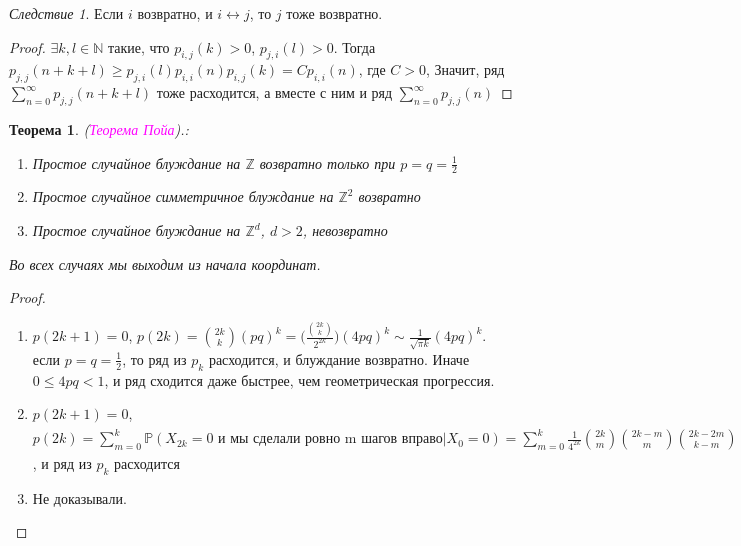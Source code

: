 \documentclass[a4paper,100pt]{article}
\theoremstyle{indented}
\newtheorem{theorem}{Теорема}
\theoremstyle{definition}
\theoremstyle{remark}
\newtheorem{cons}{Следствие}
\begin{document}
\begin{cons}
  Если $i$ возвратно, и $i \leftrightarrow j$, то $j$ тоже возвратно.
\end{cons}

\begin{proof}
  $\exists k, l \in \mathbb{N}$ такие, что $p_{i, j}(k)>0$, $p_{j, i}(l)>0$. Тогда $p_{j, j}(n+k+l) \geq p_{j, i}(l)p_{i, i}(n)p_{i, j}(k)=Cp_{i, i}(n)$, где $C>0$, Значит, ряд $\sum_{n=0}^{\infty} p_{j, j}(n+k+l)$ тоже расходится, а вместе с ним и ряд $\sum_{n=0}^{\infty} p_{j, j}(n)$
\end{proof}

\begin{theorem}
(\hypertarget{n43}{\textcolor{magenta}{\textit{Теорема Пойа}}}).: 
\begin{enumerate}
    \item Простое случайное блуждание на $\mathbb{Z}$ возвратно только при $p=q=\frac{1}{2}$
    \item Простое случайное симметричное блуждание на $\mathbb{Z}^2$ возвратно
    \item Простое случайное блуждание на $\mathbb{Z}^d$, $d>2$, невозвратно
\end{enumerate}
Во всех случаях мы выходим из начала координат.
\end{theorem}

\begin{proof} \
\begin{enumerate}
    \item $p(2k+1)=0$, $p(2k)= {2k \choose k}(pq)^k = \Big ( \frac{{2k \choose k}}{2^{2k}} \Big )(4pq)^k \sim \frac{1}{\sqrt{\pi k}}(4pq)^k$. если $p=q=\frac{1}{2}$, то ряд из $p_k$ расходится, и блуждание возвратно. Иначе $0 \leq 4pq<1$, и ряд сходится даже быстрее, чем геометрическая прогрессия.
    \item  $p(2k+1)=0$, $p(2k)=\sum_{m=0}^k \mathbb{P}(X_{2k}=0 \text{ и мы сделали ровно m шагов вправо} | X_0=0)=\sum_{m=0}^k \frac{1}{4^{2k}} {2k \choose m}{2k-m \choose m}{2k-2m \choose k-m}=\frac{1}{4^{2k}} \sum_{m=0}^k  \frac{(2k)!}{m!(2k-m)!} \frac{(2k-m)!}{m!(2k-2m)!} \frac{(2k-2m)!}{((k-m)!)(k-m)!}=\frac{1}{4^{2k}} \sum_{m=0}^k  \frac{(2k)!}{(m!)^2((k-m)!)^2}=\frac{1}{4^{2k}} {2k \choose k}\sum_{m=0}^k {k\choose m}^2=\Big (\frac{{2k \choose k}}{4^k}\Big)^2  \sim \frac{1}{\pi k} $, и ряд из $p_k$ расходится
    \item Не доказывали.
\end{enumerate}
\end{proof}
\end{document}
